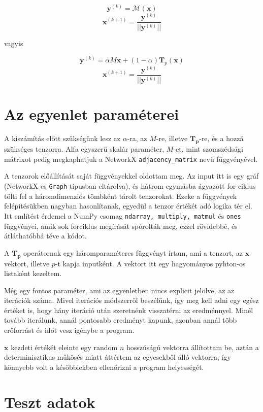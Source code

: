 \documentclass[12pt,numbers=noenddot]{report}
\begin{document}
$$\boldsymbol{y}^{(k)} = \mathcal{M}(\boldsymbol{x})$$
$$\boldsymbol{x}^{(k+1)} = \frac{\boldsymbol{y}^{(k)}}{||\boldsymbol{y}^{(k)}||}$$

vagyis

$$\boldsymbol{y}^{(k)} = \alpha M \boldsymbol{x} + (1-\alpha) \boldsymbol{T}_p(\boldsymbol{x})$$
$$\boldsymbol{x}^{(k+1)} = \frac{\boldsymbol{y}^{(k)}}{||\boldsymbol{y}^{(k)}||}$$


\section{Az egyenlet paraméterei}

A kiszámítás előtt szükségünk lesz az $\alpha$-ra, az $M$-re, illetve $\boldsymbol{T_p}$-re, és a hozzá szükséges tenzorra.
Alfa egyszerű skalár paraméter, $M$-et, mint szomszédsági mátrixot pedig megkaphatjuk 
a NetworkX \texttt{adjacency\_matrix} nevű függvényével.

A tenzorok előállítását saját függvényekkel oldottam meg. 
Az input itt is egy gráf (NetworkX-es \texttt{Graph} típusban eltárolva),
és hátrom egymásba ágyazott for ciklus tölti fel a háromdimenziós tömbként tárolt tenzorokat.
Ezeke a függvények felépítésükben nagyban hasonlítanak, egyedül a tenzor értékét adó logika tér el.
Itt említést érdemel a NumPy csomag \texttt{ndarray, multiply, matmul} és \texttt{ones} függvényei,
amik sok forciklus megírását spórolták meg, ezzel rövidebbé, és átláthatóbbá téve a kódot.

A $\boldsymbol{T_p}$ operátornak egy háromparaméteres függvényt írtam, ami a tenzort, 
az $\boldsymbol{x}$ vektort, illetve $p$-t kapja inputként. 
A vektort itt egy hagyományos pyhton-os listaként kezeltem.

Még egy fontos paraméter, ami az egyenletben nincs explicit jelölve, az az iterációk száma.
Mivel iterációs módszerről beszélünk, így meg kell adni egy egész értéket is, 
hogy hány iteráció után szeretnénk visszatérni az eredménnyel. Minél tovább iterálunk,
annál pontosabb eredményt kapunk, azonban annál több erőforrást és időt vesz igénybe a program.

$\boldsymbol{x}$ kezdeti értékét eleinte egy random $n$ hosszúságú vektorra állítottam be,
aztán a determinisztikus műkösés miatt áttértem az egyesekből álló vektorra, így 
könnyebb volt a későbbiekben ellenőrizni a program helyességét.


\section{Teszt adatok}
\end{document}
